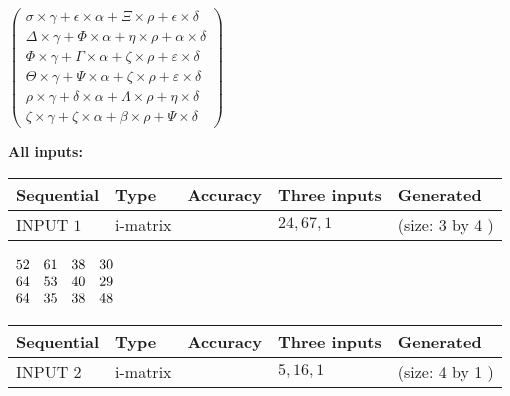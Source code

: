\documentclass[12pt]{article}
\begin{document}
   
 $  \left( \begin{array}
 {
 c
 }
  \sigma \times  \gamma +  \epsilon \times  \alpha +                     \Xi \times  \rho +  \epsilon \times  \delta \\ 
  \Delta \times  \gamma +  \Phi \times  \alpha +  \eta \times  \rho +  \alpha \times  \delta \\ 
  \Phi \times  \gamma +  \Gamma \times  \alpha +                     \zeta \times  \rho +  \varepsilon \times  \delta \\ 
  \Theta \times  \gamma +  \Psi \times  \alpha +                     \zeta \times  \rho +  \varepsilon \times  \delta \\ 
  \rho \times  \gamma +  \delta \times  \alpha +  \Lambda \times  \rho +  \eta \times  \delta \\ 
                     \zeta \times  \gamma +                     \zeta \times  \alpha +  \beta \times  \rho +  \Psi \times  \delta
 \end{array} \right) $ 
   
   
\noindent\vspace{0.1in}\hspace{-0.08in} {\textbf{\Large{All inputs: }}}
   
   
  
  
\noindent\begin{tabular}{|l|l|l|l|l|}
\hline
 Sequential & Type & Accuracy & Three inputs & Generated \\ 
\hline
 
 
  INPUT $            1 $ & i-matrix &  & $
 24
 , 
 67
 , 
 1
 $ & (size:            3  by            4 )
 \\  \hline  
 \end{tabular}
   
   
 $\begin{array}{
 c
 c
 c
 c
 }
          52  & 
          61  & 
          38  & 
          30  \\ 
          64  & 
          53  & 
          40  & 
          29  \\ 
          64  & 
          35  & 
          38  & 
          48
\end{array}  $ 
  
  
\noindent\begin{tabular}{|l|l|l|l|l|}
\hline
 Sequential & Type & Accuracy & Three inputs & Generated \\ 
\hline
 
 
  INPUT $            2 $ & i-matrix &  & $
 5
 , 
 16
 , 
 1
 $ & (size:            4  by            1 )
 \\  \hline  
 \end{tabular}
   
\end{document}
